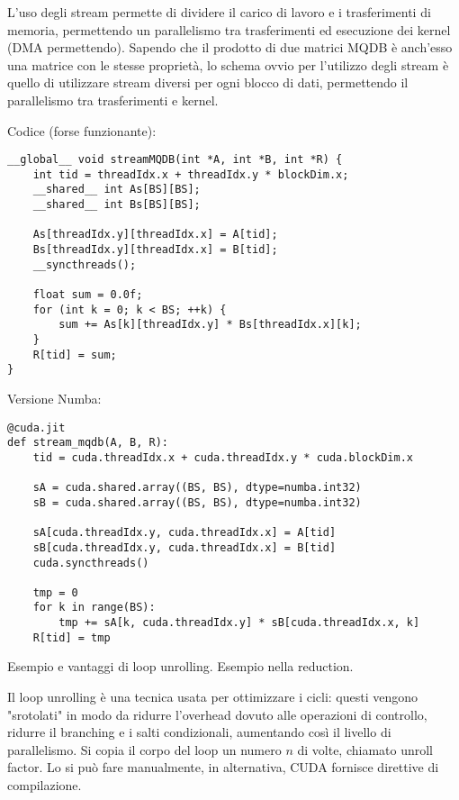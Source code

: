 \begin{questions}
\begin{solution}
        L'uso degli stream permette di dividere il carico di lavoro e i trasferimenti di memoria, permettendo un parallelismo tra trasferimenti ed esecuzione dei kernel (DMA permettendo). Sapendo che il prodotto di due matrici MQDB è anch'esso una matrice con le stesse proprietà, lo schema ovvio per l'utilizzo degli stream è quello di utilizzare stream diversi per ogni blocco di dati, permettendo il parallelismo tra trasferimenti e kernel.
        
        Codice (forse funzionante):
        \begin{verbatim}
__global__ void streamMQDB(int *A, int *B, int *R) {
    int tid = threadIdx.x + threadIdx.y * blockDim.x;
    __shared__ int As[BS][BS];
    __shared__ int Bs[BS][BS];

    As[threadIdx.y][threadIdx.x] = A[tid];
    Bs[threadIdx.y][threadIdx.x] = B[tid];
    __syncthreads();

    float sum = 0.0f;
    for (int k = 0; k < BS; ++k) {
        sum += As[k][threadIdx.y] * Bs[threadIdx.x][k];
    }
    R[tid] = sum;
}
        \end{verbatim}
        
        Versione Numba:
        \begin{verbatim}
@cuda.jit
def stream_mqdb(A, B, R):
    tid = cuda.threadIdx.x + cuda.threadIdx.y * cuda.blockDim.x

    sA = cuda.shared.array((BS, BS), dtype=numba.int32)
    sB = cuda.shared.array((BS, BS), dtype=numba.int32)

    sA[cuda.threadIdx.y, cuda.threadIdx.x] = A[tid]
    sB[cuda.threadIdx.y, cuda.threadIdx.x] = B[tid]
    cuda.syncthreads()

    tmp = 0
    for k in range(BS):
        tmp += sA[k, cuda.threadIdx.y] * sB[cuda.threadIdx.x, k]
    R[tid] = tmp
        \end{verbatim}
    \end{solution}
    
    \question Esempio e vantaggi di loop unrolling. Esempio nella reduction.
    
    \begin{solution}
        Il loop unrolling è una tecnica usata per ottimizzare i cicli: questi vengono "srotolati" in modo da ridurre l'overhead dovuto alle operazioni di controllo, ridurre il branching e i salti condizionali, aumentando così il livello di parallelismo. Si copia il corpo del loop un numero $n$ di volte, chiamato unroll factor. Lo si può fare manualmente, in alternativa, CUDA fornisce direttive di compilazione.
        

\end{solution}
\end{questions}
